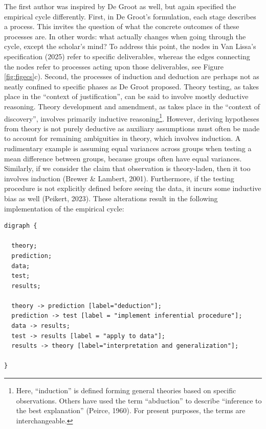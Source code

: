 \documentclass[
  man, noextraspace,floatsintext]{apa7}
\begin{document}
The first author was inspired by De Groot as well,
but again specified the empirical cycle differently.
First, in De Groot's formulation, each stage describes a process.
This invites the question of what the concrete outcomes of these processes are.
In other words: what actually changes when going through the cycle, except the scholar's mind?
To address this point, the nodes in Van Lissa's specification (2025) refer to specific deliverables, whereas the edges connecting the nodes refer to processes acting upon those deliverables, see Figure \ref{fig:figecs}c).
Second, the processes of induction and deduction are perhaps not as neatly confined to specific phases as De Groot proposed.
Theory testing, as takes place in the ``context of justification'', can be said to involve mostly deductive reasoning.
Theory development and amendment, as takes place in the ``context of discovery'', involves primarily inductive reasoning\footnote{Here, ``induction'' is defined forming general theories based on specific observations. Others have used the term ``abduction'' to describe ``inference to the best explanation'' (Peirce, 1960). For present purposes, the terms are interchangeable.}.
However, deriving hypotheses from theory is not purely deductive
as auxiliary assumptions must often be made to account for remaining ambiguities in theory, which involves induction.
A rudimentary example is assuming equal variances across groups when testing a mean difference between groups, because groups often have equal variances.
Similarly, if we consider the claim that observation is theory-laden, then it too involves induction (Brewer \& Lambert, 2001).
Furthermore, if the testing procedure is not explicitly defined before seeing the data, it incurs some inductive bias as well (Peikert, 2023).
These alterations result in the following implementation of the empirical cycle:

\begin{verbatim}
digraph {

  theory;
  prediction;
  data;
  test;
  results;
  
  theory -> prediction [label="deduction"];
  prediction -> test [label = "implement inferential procedure"];
  data -> results;
  test -> results [label = "apply to data"];
  results -> theory [label="interpretation and generalization"];

}
\end{verbatim}
\end{document}
